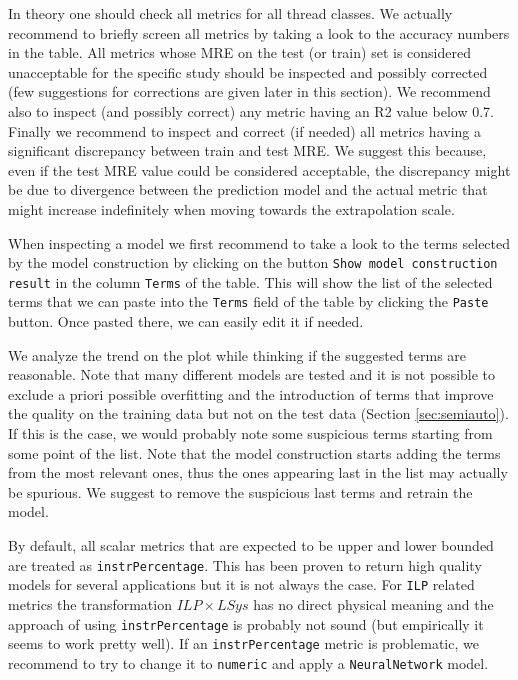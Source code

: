 \documentclass[a4paper, 10pt]{article}
\begin{document}
In theory one should check all metrics for all thread classes.
We actually recommend to briefly screen all metrics by taking a look to the accuracy numbers in the table.
All metrics whose MRE on the test (or train) set is considered unacceptable for the specific study should be inspected and possibly corrected
(few suggestions for corrections are given later in this section). We recommend also to inspect (and possibly correct)
any metric having an R2 value below 0.7.
Finally we recommend to inspect and correct (if needed) all metrics having a significant discrepancy between train and test MRE. We suggest this
because, even if the test MRE value could be considered acceptable, the discrepancy might be due to divergence between the prediction model
and the actual metric that might increase indefinitely when moving towards the extrapolation scale.

When inspecting a model we first recommend to take a look to the terms selected by the model construction by clicking on the button
\texttt{Show model construction result} in the column \texttt{Terms} of the table. This will show the list of the selected terms that we can paste
into the \texttt{Terms} field of the table by clicking the \texttt{Paste} button. Once pasted there, we can easily edit it if needed.

We analyze the trend on the plot while thinking if the suggested terms are reasonable. Note that many different models are tested
and it is not possible to exclude a priori possible overfitting and the introduction of terms that improve the quality on the training data
but not on the test data (Section \ref{sec:semiauto}). If this is the case, we would probably note some suspicious terms starting from some point of
the list. Note that the model construction starts adding the terms from the most relevant ones, thus the ones appearing last in the list 
may actually be spurious. We suggest to remove the suspicious last terms and retrain the model.

By default, all scalar metrics that are expected to be upper and lower bounded are treated as \texttt{instrPercentage}.
This has been proven to return high quality models for several applications but it is not always the case. For \texttt{ILP}
related metrics the transformation $ILP\times LSys$ has no direct physical meaning and the approach of using \texttt{instrPercentage}
is probably not sound (but empirically it seems to work pretty well). If an \texttt{instrPercentage} metric is problematic,
we recommend to try to change it to \texttt{numeric} and apply a \texttt{NeuralNetwork} model.
\end{document}
